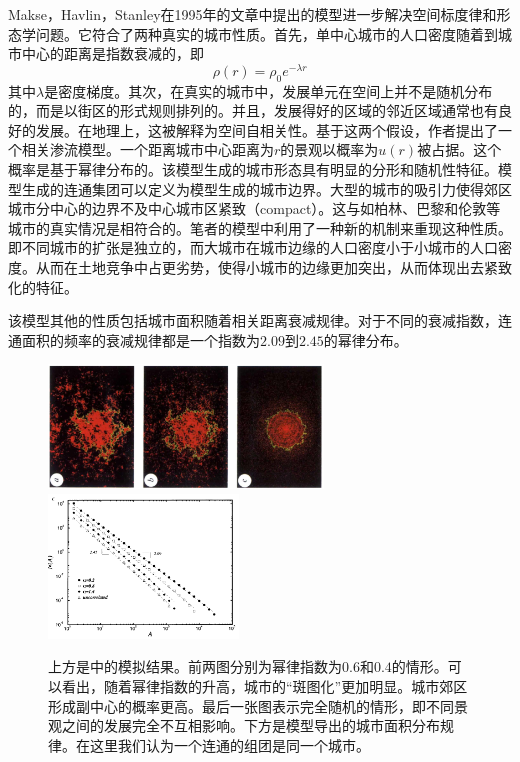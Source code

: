 Makse，Havlin，Stanley在1995年的文章\cite{Makse1995}中提出的模型进一步解决空间标度律和形态学问题。它符合了两种真实的城市性质。首先，单中心城市的人口密度随着到城市中心的距离是指数衰减的，即\[\rho(r)=\rho_0 e^{-\lambda r}\]其中$\lambda$是密度梯度。其次，在真实的城市中，发展单元在空间上并不是随机分布的，而是以街区的形式规则排列的。并且，发展得好的区域的邻近区域通常也有良好的发展。在地理上，这被解释为空间自相关性。基于这两个假设，作者提出了一个相关渗流模型。一个距离城市中心距离为$r$的景观以概率为$u(r)$被占据。这个概率是基于幂律分布的。该模型生成的城市形态具有明显的分形和随机性特征。模型生成的连通集团可以定义为模型生成的城市边界。大型的城市的吸引力使得郊区城市分中心的边界不及中心城市区紧致（compact）。这与如柏林、巴黎和伦敦等城市的真实情况是相符合的\cite{Batty2006}。笔者的模型中利用了一种新的机制来重现这种性质。即不同城市的扩张是独立的，而大城市在城市边缘的人口密度小于小城市的人口密度。从而在土地竞争中占更劣势，使得小城市的边缘更加突出，从而体现出去紧致化的特征。

该模型其他的性质包括城市面积随着相关距离衰减规律。对于不同的衰减指数，连通面积的频率的衰减规律都是一个指数为$2.09$到$2.45$的幂律分布。
\begin{figure}
    \centering
    \includegraphics[width = 0.65\textwidth]{pictures/modellingurbanpattern.png}
    \includegraphics[width = 0.45\textwidth]{pictures/area_scaling.png}
    \caption{上方是\cite{Makse1995}中的模拟结果。前两图分别为幂律指数为$0.6$和$0.4$的情形。可以看出，随着幂律指数的升高，城市的“斑图化”更加明显。城市郊区形成副中心的概率更高。最后一张图表示完全随机的情形，即不同景观之间的发展完全不互相影响。下方是\cite{Makse1995}模型导出的城市面积分布规律。在这里我们认为一个连通的组团是同一个城市。}
\end{figure}

